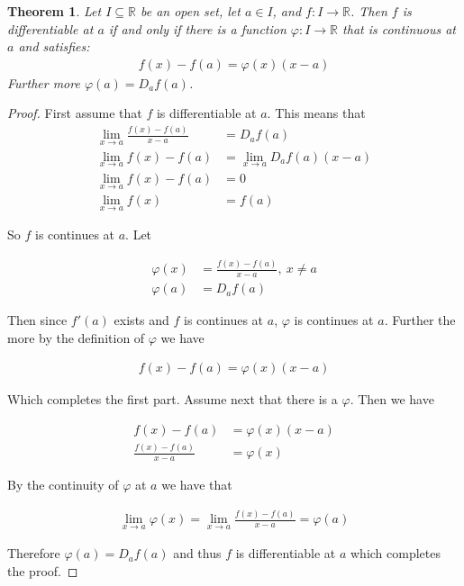 \documentclass{article}
\newtheorem{theorem}{Theorem}[section]
\begin{document}
\begin{theorem}
Let $I \subseteq \mathbb{R}$ be an open set, let $a \in I$, and $f:
I \rightarrow \mathbb{R}$. Then $f$ is differentiable at $a$ if and
only if there is a function $\varphi: I \rightarrow \mathbb{R}$ that is
continuous at $a$ and satisfies:
\begin{align}
    f(x)-f(a)=\varphi(x)(x-a)
\end{align}
Further more $\varphi(a)=D_a f(a)$.
\end{theorem}
\begin{proof}
First assume that $f$ is differentiable at $a$. This means that
\begin{align}
    \lim_{x \rightarrow a} \frac{f(x)-f(a)}{x-a} &=D_a f(a) \\
    \lim_{x \rightarrow a} f(x)-f(a) &= 
    \lim_{x \rightarrow a} D_a f(a) (x-a) \nonumber \\
    \lim_{x \rightarrow a} f(x)-f(a) &= 0 \nonumber \\
    \lim_{x \rightarrow a} f(x) &= f(a) \nonumber
\end{align}

So $f$ is continues at $a$. Let

\begin{align}
    \varphi(x) &= \frac{f(x)-f(a)}{x-a},\ x \neq a \\ \nonumber
    \varphi(a) &= D_a f(a)
\end{align}

Then since $f'(a)$ exists and $f$ is continues at $a$, $\varphi$ is
continues at $a$. Further the more by the definition of $\varphi$ we have

\begin{align}
    f(x)-f(a) = \varphi(x)(x-a)
\end{align}

Which completes the first part. Assume next that there is a
$\varphi$. Then we have

\begin{align}
    f(x)-f(a) &= \varphi(x)(x-a) \\
    \frac{f(x)-f(a)}{x-a} &= \varphi(x) \nonumber
\end{align}

By the continuity of $\varphi$ at $a$ we have that

\begin{align}
    \lim_{x \rightarrow a} \varphi(x) = \lim_{x \rightarrow a}
    \frac{f(x)-f(a)}{x-a} = \varphi(a)
\end{align}

Therefore $\varphi(a) = D_a f(a)$ and thus $f$ is differentiable at $a$
which completes the proof.
\end{proof}
\end{document}

